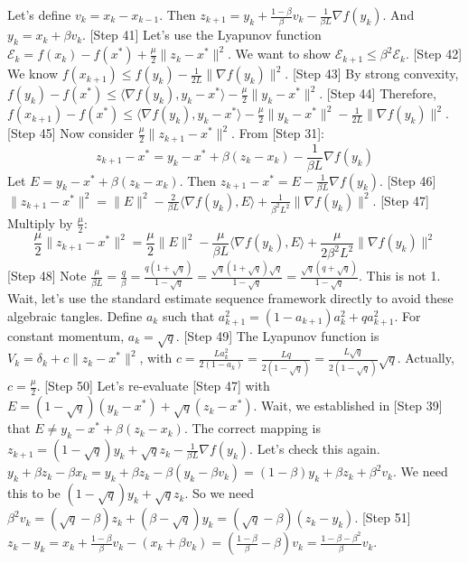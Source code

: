 \documentclass{article}
\begin{document}
Let's define $v_k = x_k - x_{k-1}$. Then $z_{k+1} = y_k + \frac{1-\beta}{\beta}v_k - \frac{1}{\beta L}\nabla f(y_k)$.
And $y_k = x_k + \beta v_k$.
[Step 41] Let's use the Lyapunov function $\mathcal{E}_k = f(x_k) - f(x^*) + \frac{\mu}{2}\|z_k - x^*\|^2$.
We want to show $\mathcal{E}_{k+1} \le \beta^2 \mathcal{E}_k$.
[Step 42] We know $f(x_{k+1}) \le f(y_k) - \frac{1}{2L}\|\nabla f(y_k)\|^2$.
[Step 43] By strong convexity, $f(y_k) - f(x^*) \le \langle \nabla f(y_k), y_k - x^* \rangle - \frac{\mu}{2}\|y_k - x^*\|^2$.
[Step 44] Therefore, $f(x_{k+1}) - f(x^*) \le \langle \nabla f(y_k), y_k - x^* \rangle - \frac{\mu}{2}\|y_k - x^*\|^2 - \frac{1}{2L}\|\nabla f(y_k)\|^2$.
[Step 45] Now consider $\frac{\mu}{2}\|z_{k+1} - x^*\|^2$. From [Step 31]:
$$ z_{k+1} - x^* = y_k - x^* + \beta(z_k - x_k) - \frac{1}{\beta L}\nabla f(y_k) $$
Let $E = y_k - x^* + \beta(z_k - x_k)$. Then $z_{k+1} - x^* = E - \frac{1}{\beta L}\nabla f(y_k)$.
[Step 46] $\|z_{k+1} - x^*\|^2 = \|E\|^2 - \frac{2}{\beta L}\langle \nabla f(y_k), E \rangle + \frac{1}{\beta^2 L^2}\|\nabla f(y_k)\|^2$.
[Step 47] Multiply by $\frac{\mu}{2}$:
$$ \frac{\mu}{2}\|z_{k+1} - x^*\|^2 = \frac{\mu}{2}\|E\|^2 - \frac{\mu}{\beta L}\langle \nabla f(y_k), E \rangle + \frac{\mu}{2\beta^2 L^2}\|\nabla f(y_k)\|^2 $$
[Step 48] Note $\frac{\mu}{\beta L} = \frac{q}{\beta} = \frac{q(1+\sqrt{q})}{1-\sqrt{q}} = \frac{\sqrt{q}(1+\sqrt{q})\sqrt{q}}{1-\sqrt{q}} = \frac{\sqrt{q}(q+\sqrt{q})}{1-\sqrt{q}}$. This is not 1.
Wait, let's use the standard estimate sequence framework directly to avoid these algebraic tangles.
Define $a_k$ such that $a_{k+1}^2 = (1 - a_{k+1})a_k^2 + q a_{k+1}^2$. For constant momentum, $a_k = \sqrt{q}$.
[Step 49] The Lyapunov function is $V_k = \delta_k + c \|z_k - x^*\|^2$, with $c = \frac{L a_k^2}{2(1-a_k)} = \frac{L q}{2(1-\sqrt{q})} = \frac{L \sqrt{q}}{2(1-\sqrt{q})} \sqrt{q}$.
Actually, $c = \frac{\mu}{2}$.
[Step 50] Let's re-evaluate [Step 47] with $E = (1-\sqrt{q})(y_k - x^*) + \sqrt{q}(z_k - x^*)$.
Wait, we established in [Step 39] that $E \neq y_k - x^* + \beta(z_k - x_k)$.
The correct mapping is $z_{k+1} = (1-\sqrt{q})y_k + \sqrt{q}z_k - \frac{1}{\beta L}\nabla f(y_k)$. Let's check this again.
$y_k + \beta z_k - \beta x_k = y_k + \beta z_k - \beta(y_k - \beta v_k) = (1-\beta)y_k + \beta z_k + \beta^2 v_k$.
We need this to be $(1-\sqrt{q})y_k + \sqrt{q}z_k$.
So we need $\beta^2 v_k = (\sqrt{q} - \beta)z_k + (\beta - \sqrt{q})y_k = (\sqrt{q} - \beta)(z_k - y_k)$.
[Step 51] $z_k - y_k = x_k + \frac{1-\beta}{\beta}v_k - (x_k + \beta v_k) = (\frac{1-\beta}{\beta} - \beta)v_k = \frac{1-\beta-\beta^2}{\beta}v_k$.
\end{document}
